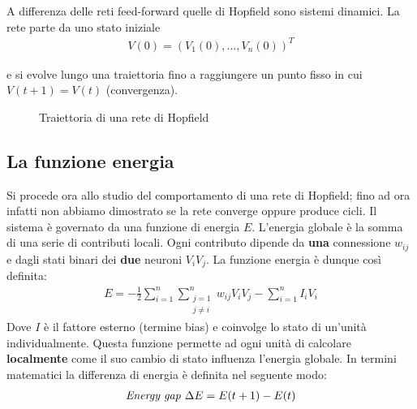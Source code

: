 \newpage

A differenza delle reti feed-forward quelle di Hopfield sono sistemi dinamici. La rete parte da uno stato iniziale
\begin{align*}
    V(0) = (V_1(0), \dots, V_n(0))^T
\end{align*}

 e si evolve lungo una traiettoria fino a raggiungere un punto fisso in cui $V(t+1) = V(t)$ (convergenza).
 \begin{figure}[h!]
     \centering
     \caption{Traiettoria di una rete di Hopfield}
 \end{figure}

\subsection{La funzione energia} %
\label{sub:funzione_energia}
Si procede ora allo studio del comportamento di una rete di Hopfield; fino ad ora infatti non abbiamo dimostrato se la rete converge oppure produce cicli. Il sistema è governato da una funzione di energia $E$. L'energia globale è la somma di una serie di contributi locali. Ogni contributo dipende da \textbf{una} connessione $w_{ij}$ e dagli stati binari dei \textbf{due} neuroni $V_i V_j$. La funzione energia è dunque così definita:
\begin{align}
    E = - \frac{1}{2} \sum_{i=1}^n \sum_{\substack{j=1 \\ j \neq i}}^n w_{ij} V_i V_j - \sum_{i=1}^n I_i V_i\label{eq:energy}
\end{align}
Dove $I$ è il fattore esterno (termine bias) e coinvolge lo stato di un'unità individualmente. Questa funzione permette ad ogni unità di calcolare \textbf{localmente} come il suo cambio di stato influenza l'energia globale. In termini matematici la differenza di energia è definita nel seguente modo:
\begin{align}
    \emph{Energy gap }\Delta E = E(t + 1) - E(t)
\end{align}


